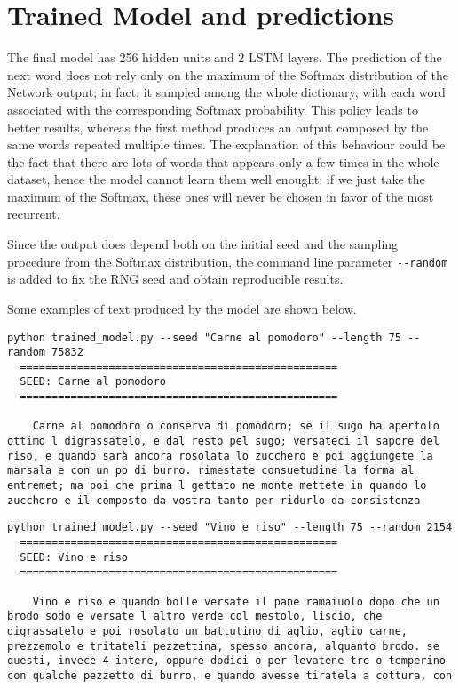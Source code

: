\documentclass[a4paper,11pt]{article}
\begin{document}
\section{Trained Model and predictions}
The final model has 256 hidden units and 2 LSTM layers. The prediction of the next word does not rely only on the maximum of the Softmax distribution of the Network output; in fact, it sampled among the whole dictionary, with each word associated with the corresponding Softmax probability. This policy leads to better results, whereas the first method produces an output composed by the same words repeated multiple times. The explanation of this behaviour could be the fact that there are lots of words that appears only a few times in the whole dataset, hence the model cannot learn them well enought: if we just take the maximum of the Softmax, these ones will never be chosen in favor of the most recurrent.

Since the output does depend both on the initial seed and the sampling procedure from the Softmax distribution, the command line parameter \texttt{-{}-random} is added to fix the RNG seed and obtain reproducible results.

Some examples of text produced by the model are shown below.

\begin{lstlisting}[caption={\emph{SEED}: Carne al pomodoro, \emph{RNG seed}: 75832}]
  python trained_model.py --seed "Carne al pomodoro" --length 75 --random 75832
  ==================================================
  SEED: Carne al pomodoro
  ==================================================

    Carne al pomodoro o conserva di pomodoro; se il sugo ha apertolo ottimo l digrassatelo, e dal resto pel sugo; versateci il sapore del riso, e quando sarà ancora rosolata lo zucchero e poi aggiungete la marsala e con un po di burro. rimestate consuetudine la forma al entremet; ma poi che prima l gettato ne monte mettete in quando lo zucchero e il composto da vostra tanto per ridurlo da consistenza
\end{lstlisting}

\begin{lstlisting}[caption={\emph{SEED}: Vino e riso, \emph{RNG seed}: 2154}]
  python trained_model.py --seed "Vino e riso" --length 75 --random 2154
  ==================================================
  SEED: Vino e riso
  ==================================================

    Vino e riso e quando bolle versate il pane ramaiuolo dopo che un brodo sodo e versate l altro verde col mestolo, liscio, che digrassatelo e poi rosolato un battutino di aglio, aglio carne, prezzemolo e tritateli pezzettina, spesso ancora, alquanto brodo. se questi, invece 4 intere, oppure dodici o per levatene tre o temperino con qualche pezzetto di burro, e quando avesse tiratela a cottura, con
\end{lstlisting}
\end{document}
